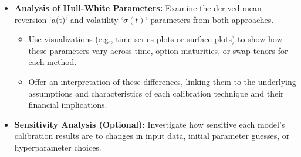 \begin{itemize}
	\item \textbf{Analysis of Hull-White Parameters:} Examine the derived mean reversion `a(t)` and volatility `$\sigma(t)$` parameters from both approaches.
	      \begin{itemize}
		      \item Use visualizations (e.g., time series plots or surface plots) to show how these parameters vary across time, option maturities, or swap tenors for each method.
		      \item Offer an interpretation of these differences, linking them to the underlying assumptions and characteristics of each calibration technique and their financial implications.
	      \end{itemize}
	\item \textbf{Sensitivity Analysis (Optional):} Investigate how sensitive each model's calibration results are to changes in input data, initial parameter guesses, or hyperparameter choices.
\end{itemize}
